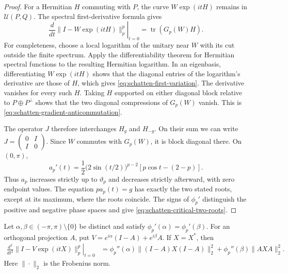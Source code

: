 \begin{proof}
For a Hermitian $H$ commuting with $P$, the curve $W\exp(itH)$ remains
in $\mathcal U(P,Q)$. The spectral first-derivative formula gives
\begin{equation}
 \left.\frac{d}{dt}\|I-W\exp(itH)\|_p^p\right|_{t=0}
              =\operatorname{tr}(G_p(W)H).
 \label{eq:schatten-first-variation}
\end{equation}
For completeness, choose a local logarithm of the unitary near $W$ with
its cut outside the finite spectrum. Apply the differentiability theorem
for Hermitian spectral functions \citep[Theorem~1.1]{lewis1996derivatives}
to the resulting Hermitian logarithm. In an eigenbasis, differentiating
$W\exp(itH)$ shows that the diagonal entries of the logarithm's derivative
are those of $H$, which gives \cref{eq:schatten-first-variation}.
The derivative vanishes for every such $H$. Taking $H$ supported on
either diagonal block relative to $P\oplus P^\perp$ shows that the two
diagonal compressions of $G_p(W)$ vanish. This is
\cref{eq:schatten-gradient-anticommutation}.

The operator $J$ therefore interchanges $H_g$ and $H_{-g}$. On their sum
we can write $J=\left(\begin{smallmatrix}0&I\\I&0\end{smallmatrix}\right)$.
Since $W$ commutes with $G_p(W)$, it is block diagonal there. On
$(0,\pi)$,
\begin{equation}
 a_p'(t)=\frac12\bigl(2\sin(t/2)\bigr)^{p-2}
                    [p\cos t-(2-p)].
 \label{eq:schatten-amplitude-derivative}
\end{equation}
Thus $a_p$ increases strictly up to $\vartheta_p$ and decreases strictly
afterward, with zero endpoint values. The equation $p a_p(t)=g$ has
exactly the two stated roots, except at its maximum, where the roots
coincide. The signs of $\phi_p'$ distinguish the positive and negative
phase spaces and give \cref{eq:schatten-critical-two-roots}.
\end{proof}

\begin{lemma}
\label{lem:schatten-two-phase-hessian}
Let $\alpha,\beta\in(-\pi,\pi)\setminus\{0\}$ be distinct and satisfy
$\phi_p'(\alpha)=\phi_p'(\beta)$. For an orthogonal projection $A$, put
$V=e^{i\alpha}(I-A)+e^{i\beta}A$. If $X=X^*$, then
\begin{align}
 \left.\frac{d^2}{dt^2}\|I-V\exp(itX)\|_p^p\right|_{t=0}
  &=\phi_p''(\alpha)\|(I-A)X(I-A)\|_2^2
    +\phi_p''(\beta)\|AXA\|_2^2.
 \label{eq:schatten-two-phase-hessian}
\end{align}
Here $\|\cdot\|_2$ is the Frobenius norm.
\end{lemma}

